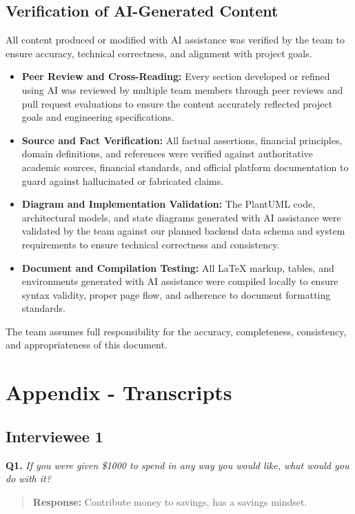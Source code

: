 \documentclass[12pt]{article}
\begin{document}
\subsection{Verification of AI-Generated Content}
All content produced or modified with AI assistance was verified by the team to ensure accuracy, technical correctness, and alignment with project goals. 
\begin{itemize}
    \item \textbf{Peer Review and Cross-Reading:} Every section developed or
    refined using AI was reviewed by multiple team members through peer reviews
    and pull request evaluations to ensure the content accurately reflected
    project goals and engineering specifications.
    \item \textbf{Source and Fact Verification:} All factual assertions,
    financial principles, domain definitions, and references were verified
    against authoritative academic sources, financial standards, and official
    platform documentation to guard against hallucinated or fabricated claims.
    \item \textbf{Diagram and Implementation Validation:} The PlantUML code,
    architectural models, and state diagrams generated with AI assistance were validated by the team
    against our planned backend data schema and system requirements to ensure
    technical correctness and consistency.
    \item \textbf{Document and Compilation Testing:} All LaTeX markup,
    tables, and environments generated with AI assistance were compiled locally
    to ensure syntax validity, proper page flow, and adherence to document
    formatting standards.
\end{itemize}
The team assumes full responsibility for the accuracy, completeness,
consistency, and appropriateness of this document.

\section{Appendix - Transcripts}
\subsection{Interviewee 1}

\medskip
\noindent\textbf{Q1.} \textit{If you were given \$1000 to spend in any way you would like, what would you do with it?}

\begin{quote}
\textbf{Response:} Contribute money to savings, has a savings mindset.\par
\end{quote}
\end{document}
